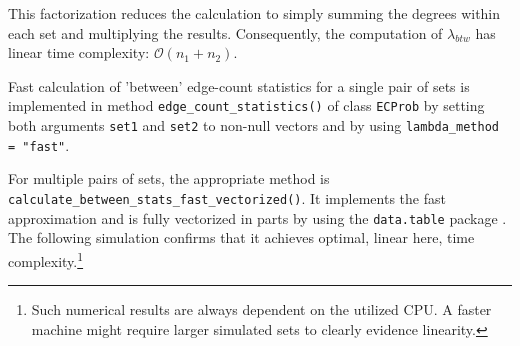 \documentclass{article}\usepackage[]{graphicx}\usepackage[]{xcolor}
\begin{document}
This factorization reduces the calculation to simply summing the degrees within each set and multiplying the results. Consequently, the computation of $\lambda_{btw}$ has linear time complexity: $\mathcal{O}\left( n_1 + n_2 \right)$.

Fast calculation of 'between' edge-count statistics for a single pair of sets is implemented in method \texttt{edge\_count\_statistics()} of class \texttt{ECProb} by setting both arguments \texttt{set1} and \texttt{set2} to non-null vectors and by using \texttt{lambda\_method = "fast"}.

For multiple pairs of sets, the appropriate method is
\texttt{calculate\_between\_stats\_fast\_vectorized()}. It implements the fast approximation and is fully vectorized in parts by using the \texttt{data.table} package \cite{datatable2025}. The following simulation confirms that it achieves optimal, linear here, time complexity.\footnote{Such numerical results are always dependent on the utilized CPU. A faster machine might require larger simulated sets to clearly evidence linearity.}
\end{document}
